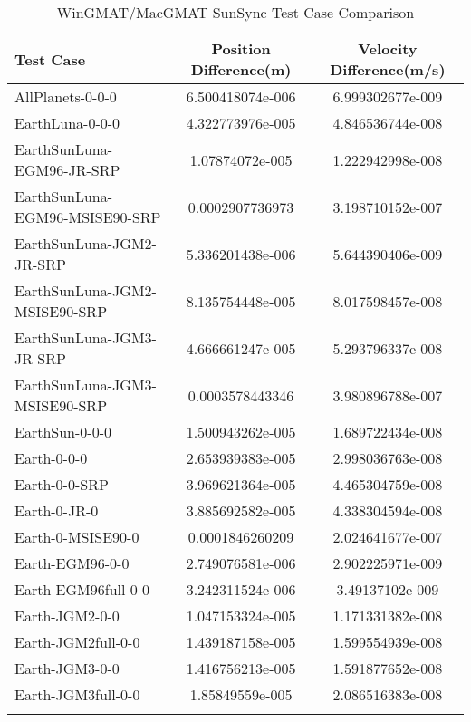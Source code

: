 \begin{table}[htbp!]
\centering
\caption{ WinGMAT/MacGMAT SunSync Test Case Comparison}
      \begin{tabular}{lcc}
      \hline\hline
          Test Case & Position Difference(m) & Velocity Difference(m/s) \\
         \hline
         AllPlanets-0-0-0 & 6.500418074e-006 & 6.999302677e-009 \\
         EarthLuna-0-0-0 & 4.322773976e-005 & 4.846536744e-008 \\
         EarthSunLuna-EGM96-JR-SRP & 1.07874072e-005 & 1.222942998e-008 \\
         EarthSunLuna-EGM96-MSISE90-SRP & 0.0002907736973 & 3.198710152e-007 \\
         EarthSunLuna-JGM2-JR-SRP & 5.336201438e-006 & 5.644390406e-009 \\
         EarthSunLuna-JGM2-MSISE90-SRP & 8.135754448e-005 & 8.017598457e-008 \\
         EarthSunLuna-JGM3-JR-SRP & 4.666661247e-005 & 5.293796337e-008 \\
         EarthSunLuna-JGM3-MSISE90-SRP & 0.0003578443346 & 3.980896788e-007 \\
         EarthSun-0-0-0 & 1.500943262e-005 & 1.689722434e-008 \\
         Earth-0-0-0 & 2.653939383e-005 & 2.998036763e-008 \\
         Earth-0-0-SRP & 3.969621364e-005 & 4.465304759e-008 \\
         Earth-0-JR-0 & 3.885692582e-005 & 4.338304594e-008 \\
         Earth-0-MSISE90-0 & 0.0001846260209 & 2.024641677e-007 \\
         Earth-EGM96-0-0 & 2.749076581e-006 & 2.902225971e-009 \\
         Earth-EGM96full-0-0 & 3.242311524e-006 & 3.49137102e-009 \\
         Earth-JGM2-0-0 & 1.047153324e-005 & 1.171331382e-008 \\
         Earth-JGM2full-0-0 & 1.439187158e-005 & 1.599554939e-008 \\
         Earth-JGM3-0-0 & 1.416756213e-005 & 1.591877652e-008 \\
         Earth-JGM3full-0-0 & 1.85849559e-005 & 2.086516383e-008 \\
      \hline\hline
      \label{Table: SunSync WinGMAT-MacGMAT Table} 
\end{tabular}
\end{table}
